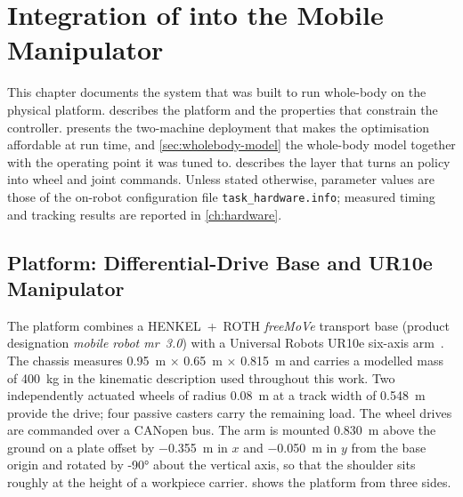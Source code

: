 \chapter{Integration of \ocs{} into the \hero{} Mobile Manipulator}
\label{ch:integration}

This chapter documents the system that was built to run \ocs{} whole-body
\mpc{} on the physical \hero{} platform. 
describes the platform and the properties that constrain the controller.
 presents the two-machine deployment that
makes the optimisation affordable at run time, and
\cref{sec:wholebody-model} the whole-body model together with the
operating point it was tuned to.  describes the
layer that turns an \ocs{} policy into wheel and joint commands. Unless
stated otherwise, parameter values are those of the on-robot
configuration file \texttt{task\_hardware.info}; measured timing and
tracking results are reported in \cref{ch:hardware}.

\section{\hero{} Platform: Differential-Drive Base and UR10e Manipulator}
\label{sec:hero-platform}

The \hero{} platform combines a HENKEL~+~ROTH \emph{freeMoVe} transport
base (product designation \emph{mobile robot mr~3.0}) with a Universal
Robots UR10e six-axis
arm~\cite{HenkelRoth2019freeMoVe,HenkelRoth2020mr3ROS,UR10e}. The
chassis measures \qty{0.95}{\meter} $\times$ \qty{0.65}{\meter} $\times$
\qty{0.815}{\meter} and carries a modelled mass of \qty{400}{\kilo\gram}
in the kinematic description used throughout this work. Two
independently actuated wheels of radius \qty{0.08}{\meter} at a track
width of \qty{0.548}{\meter} provide the drive; four passive casters
carry the remaining load. The wheel drives are commanded over a CANopen
bus. The arm is mounted \qty{0.830}{\meter} above the ground on a plate
offset by \qty{-0.355}{\meter} in $x$ and \qty{-0.050}{\meter} in $y$
from the base origin and rotated by \ang{-90} about the vertical axis,
so that the shoulder sits roughly at the height of a workpiece carrier.
 shows the platform from three sides.

